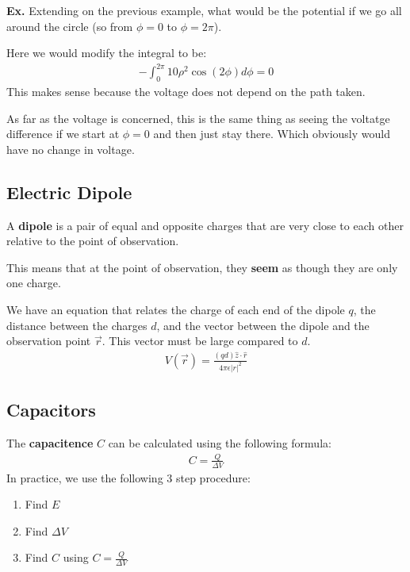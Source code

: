 \documentclass[12pt,letterpaper]{article} \usepackage{amsmath} \usepackage{graphicx} \usepackage[margin=1in]{geometry} \usepackage{longtable}  \usepackage{amssymb}
\begin{document}
	\begin{mdframed}
		\textbf{Ex. }Extending on the previous example, what would be the potential if we go all around the circle (so from $\phi = 0$ to $\phi = 2\pi$).
		
		Here we would modify the integral to be:
		\begin{align*}
			-\int^{2\pi}_0 10\rho^2 \cos(2\phi) d\phi = 0
		\end{align*}
		This makes sense because the voltage does not depend on the path taken. 
		
		As far as the voltage is concerned, this is the same thing as seeing the voltatge difference if we start at $\phi=0$ and then just stay there. Which obviously would have no change in voltage. 
	\end{mdframed}

	\subsection{Electric Dipole}
	A \textbf{dipole} is a pair of equal and opposite charges that are very close to each other relative to the point of observation.
	
	This means that at the point of observation, they \textbf{seem} as though they are only one charge. 
	
	We have an equation that relates the charge of each end of the dipole $q$, the distance between the charges $d$, and the vector between the dipole and the observation point $\vec r$. This vector must be large compared to $d$.
	\begin{align*}
		V(\vec r) = \frac{(qd) \hat z \cdot \hat r}{4\pi \epsilon |r|^2}
	\end{align*}

	\subsection{Capacitors}
	The \textbf{capacitence} $C$ can be calculated using the following formula:
	\begin{align*}
		C=\frac{Q}{\Delta V}
	\end{align*}
	In practice, we use the following 3 step procedure:
	\begin{enumerate}[noitemsep]
		\item Find $E$
		\item Find $\Delta V$
		\item Find $C$ using $C=\frac{Q}{\Delta V} $
	\end{enumerate}
\end{document}
